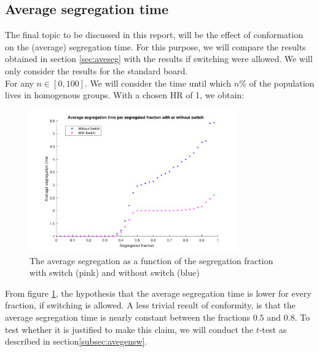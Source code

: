\subsection{Average segregation time}
The final topic to be discussed in this report, will be the effect of conformation on the (average) segregation time. 
For this purpose, we will compare the results obtained in section \ref{sec:aveseg} with the results if switching were allowed. 
We will only consider the results for the standard board.\\
For any \(n\in [0,100]\). We will consider the time until which \(n\%\) of the population lives in homogenous groups. With a chosen HR of 1, we obtain:

\begin{figure}[H]
    \centering
    \includegraphics[width=0.8\textwidth]{Avesegsw2}
    \caption{The average segregation as a function of the segregation fraction with switch (pink) and without switch (blue)}
    \label{fig:avesegsw}
\end{figure}
From figure \ref{fig:avesegsw}, the hypothesis that the average segregation time is lower for every fraction, if switching is allowed. 
A less trivial result of conformity, is that the average segregation time is nearly constant between the fractions \(0.5\) and \(0.8\). To test whether it is justified to make this claim, we will conduct the \(t\)-test as described in section\ref{subsec:avegensw}. 